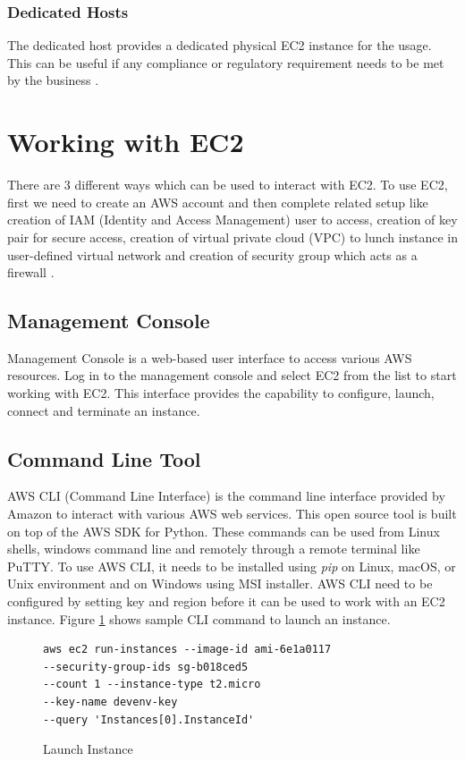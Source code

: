 \subsubsection{Dedicated Hosts} 
The dedicated host provides a dedicated physical EC2 instance for the usage. This can be useful if any compliance or regulatory requirement needs to be met by the business \cite{hid-sp18-402-www-aws-ec2Pricing}.

\section{Working with EC2}
There are 3 different ways which can be used to interact with EC2. To use EC2, first we need to create an AWS account and then complete related setup like creation of IAM (Identity and Access Management) user to access, creation of key pair for secure access, creation of virtual private cloud (VPC) to lunch instance in user-defined virtual network and creation of security group which acts as a firewall \cite{hid-sp18-402-www-aws-ec2-setup}.

\subsection{Management Console}
Management Console \cite{hid-sp18-402-www-aws-ec2-gettingStarted} is a web-based user interface to access various AWS resources. Log in to the management console and select EC2 from the list to start working with EC2. This interface provides the capability to configure, launch, connect and terminate an instance.

\subsection{Command Line Tool}
AWS CLI (Command Line Interface) \cite{hid-sp18-402-www-aws-ec2-cli} is the command line interface provided by Amazon to interact with various AWS web services. This open source tool is built on top of the AWS SDK for Python. These commands can be used from Linux shells, windows command line and remotely through a remote terminal like PuTTY. To use AWS CLI, it needs to be installed using \emph{pip} on Linux, macOS, or Unix environment and on Windows using MSI installer. AWS CLI need to be configured by setting key and region before it can be used to work with an EC2 instance.
Figure \ref{c:cli-launch} shows sample CLI command to launch an instance. 
\begin{figure}[htb]
\begin{verbatim}
aws ec2 run-instances --image-id ami-6e1a0117
--security-group-ids sg-b018ced5 
--count 1 --instance-type t2.micro 
--key-name devenv-key 
--query 'Instances[0].InstanceId'
\end{verbatim}
\caption{Launch Instance \cite{hid-sp18-402-www-aws-ec2-cli}}\label{c:cli-launch}
\end{figure}

